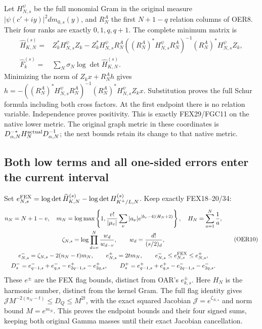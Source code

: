 \documentclass[11pt,a4paper]{article}
\begin{document}
Let $H_{N,s}^{\psi}$ be the full monomial Gram in the original
measure $|\psi(c'+iy)|^2dm_{0,s}(y)$, and $R_N^A$ the first
$N+1-q$ relation columns of OER8. Their four ranks are exactly
$0,1,q,q+1$. The complete minimum matrix is
\[
\begin{split}
 \widehat H_{K,N}^{(s)}
 ={}&Z_k^*H_{N,s}^{\psi}Z_k
 -Z_k^*H_{N,s}^{\psi}R_N^A
   ((R_N^A)^*H_{N,s}^{\psi}R_N^A)^{-1}
       (R_N^A)^*H_{N,s}^{\psi}Z_k,\\
 \widehat F_k^{(s)}
 ={}&\sum_N\sigma_N\log\det\widehat H_{K,N}^{(s)} .
\end{split}\tag{OER9}
\]
Minimizing the norm of $Z_kx+R_N^Ah$ gives
$h=-((R_N^A)^*H_{N,s}^{\psi}R_N^A)^{-1}
(R_N^A)^*H_{N,s}^{\psi}Z_kx$. Substitution proves the full
Schur formula including both cross factors. At the first endpoint
there is no relation variable. Independence proves positivity.
This is exactly FEX29/FGC11 on the native lower metric.
The original graph metric in these coordinates is
$D_{\alpha,N}^{-*}H_N^{\rm actual}D_{\alpha,N}^{-1}$;
the next bounds retain its change to that native metric.

\subsection{Both low terms and all one-sided errors enter the current interval}

Set $e_{N,s}^{\rm FEX}=\log\det\widehat H_{K,N}^{(s)}
 -\log\det H_{K^+/L,N}^{(s)}$. Keep exactly FEX18--20/34:
\[
\begin{gathered}
 n_N=N+1-v,\quad
 m_N=\log\max\left\{1,\frac{v!}{|\mu_v|}
           \sum_\nu|a_\nu|e^{|b_\nu-4|(H_N+2)}\right\},
 \quad H_N=\sum_{a=1}^{N}\frac1a,\\
 \zeta_{N,s}=\log\prod_{d=v}^{N}\frac{w_d}{w_{d-v}},
 \qquad w_d=\frac{d!}{(s/2)_d},\\
 e_{N,s}^-=\zeta_{N,s}-2(n_N-t)m_N,\qquad
 e_{N,s}^+=2tm_N,\qquad
 e_{N,s}^-\le e_{N,s}^{\rm FEX}\le e_{N,s}^+,\\
 D_s^-=e_{q-1,s}^-+e_{q,s}^--e_{2q-1,s}^+-e_{2q,s}^+,\qquad
 D_s^+=e_{q-1,s}^++e_{q,s}^+-e_{2q-1,s}^--e_{2q,s}^- .
\end{gathered}\tag{OER10}
\]
These $e^\pm$ are the FEX flag bounds, distinct from OAR's
$e_{k,s}^\pm$. Here $H_N$ is the harmonic number, distinct
from the kernel Gram. The full flag identity gives
$\mathscr J M^{-2(n_N-t)}\le D_Q\le M^{2t}$,
with the exact squared Jacobian $\mathscr J=e^{\zeta_{N,s}}$
and norm bound $M=e^{m_N}$. This proves the endpoint bounds
and their four signed sums, keeping both original Gamma masses
until their exact Jacobian cancellation.
\end{document}
